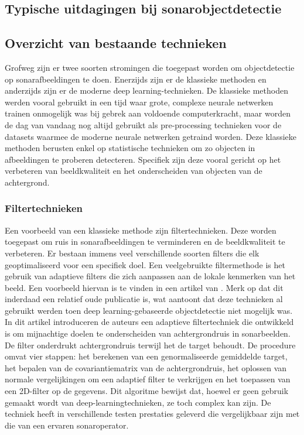 \subsection{Typische uitdagingen bij sonarobjectdetectie}

\lipsum[1-3]

\subsection{Overzicht van bestaande technieken}

Grofweg zijn er twee soorten stromingen die toegepast worden om objectdetectie op sonarafbeeldingen te doen. Enerzijds zijn er de klassieke methoden en anderzijds zijn er de moderne deep learning-technieken. De klassieke methoden werden vooral gebruikt in een tijd waar grote, complexe neurale netwerken trainen onmogelijk was bij gebrek aan voldoende computerkracht, maar worden de dag van vandaag nog altijd gebruikt als pre-processing technieken voor de datasets waarmee de moderne neurale netwerken getraind worden. Deze klassieke methoden berusten enkel op statistische technieken om zo objecten in afbeeldingen te proberen detecteren. Specifiek zijn deze vooral gericht op het verbeteren van beeldkwaliteit en het onderscheiden van objecten van de achtergrond.

\subsubsection{Filtertechnieken}

Een voorbeeld van een klassieke methode zijn filtertechnieken. Deze worden toegepast om ruis in sonarafbeeldingen te verminderen en de beeldkwaliteit te verbeteren. Er bestaan immens veel verschillende soorten filters die elk geoptimaliseerd voor een specifiek doel. Een veelgebruikte filtermethode is het gebruik van adaptieve filters die zich aanpassen aan de lokale kenmerken van het beeld. Een voorbeeld hiervan is te vinden in een artikel van \textcite{Aridgides_1995}. Merk op dat dit inderdaad een relatief oude publicatie is, wat aantoont dat deze technieken al gebruikt werden toen deep learning-gebaseerde objectdetectie niet mogelijk was. \\

In dit artikel introduceren de auteurs een adaptieve filtertechniek die ontwikkeld is om mijnachtige doelen te onderscheiden van achtergrondruis in sonarbeelden. De filter onderdrukt achtergrondruis terwijl het de target behoudt. De procedure omvat vier stappen: het berekenen van een genormaliseerde gemiddelde target, het bepalen van de covariantiematrix van de achtergrondruis, het oplossen van normale vergelijkingen om een adaptief filter te verkrijgen en het toepassen van een 2D-filter op de gegevens. Dit algoritme bewijst dat, hoewel er geen gebruik gemaakt wordt van deep-learningtechnieken, ze toch complex kan zijn. De techniek heeft in verschillende testen prestaties geleverd die vergelijkbaar zijn met die van een ervaren sonaroperator. \\

